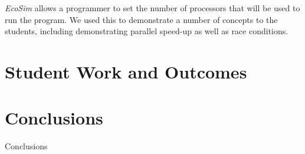 \documentclass{sig-alternate}
\begin{document}
\emph{EcoSim} allows a programmer to set the number of processors that will be used to run the
program. We used this to demonstrate a number of concepts to the students, including demonstrating
parallel speed-up as well as race conditions.  

\section{Student Work and Outcomes}

\section{Conclusions}
Conclusions



%

%
%
\end{document}
